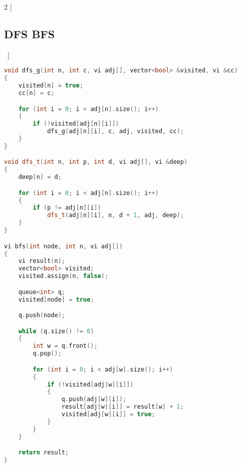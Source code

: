 \documentclass[leter]{amsart}
\begin{document}
\begin{multicols}{2}
[\subsection{DFS BFS}\ ]
\begin{lstlisting}[language=C++]
void dfs_g(int n, int c, vi adj[], vector<bool> &visited, vi &cc)
{
    visited[n] = true;
    cc[n] = c;

    for (int i = 0; i < adj[n].size(); i++)
    {
        if (!visited[adj[n][i]])
            dfs_g(adj[n][i], c, adj, visited, cc);
    }
}

void dfs_t(int n, int p, int d, vi adj[], vi &deep)
{
    deep[n] = d;

    for (int i = 0; i < adj[n].size(); i++)
    {
        if (p != adj[n][i])
            dfs_t(adj[n][i], n, d + 1, adj, deep);
    }
}

vi bfs(int node, int n, vi adj[])
{
    vi result(n);
    vector<bool> visited;
    visited.assign(n, false);

    queue<int> q;
    visited[node] = true;

    q.push(node);

    while (q.size() != 0)
    {
        int w = q.front();
        q.pop();

        for (int i = 0; i < adj[w].size(); i++)
        {
            if (!visited[adj[w][i]])
            {
                q.push(adj[w][i]);
                result[adj[w][i]] = result[w] + 1;
                visited[adj[w][i]] = true;
            }
        }
    }

    return result;
}

\end{lstlisting}
\end{multicols}
\end{document}
